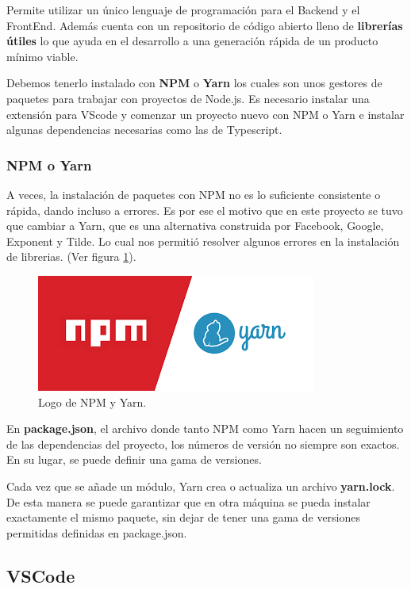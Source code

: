 \documentclass[12pt,twoside,titlepage]{report}
\begin{document}
Permite utilizar un único lenguaje de programación para el Backend y el FrontEnd. Además cuenta con un repositorio de código abierto lleno de \textbf{librerías útiles} lo que ayuda en el desarrollo a una generación rápida de un producto mínimo viable.

Debemos tenerlo instalado con \textbf{NPM} o \textbf{Yarn} los cuales son unos gestores de paquetes para trabajar con proyectos de Node.js. Es necesario instalar una extensión para VScode y comenzar un proyecto nuevo con NPM o Yarn e instalar algunas dependencias necesarias como las de Typescript.

\subsubsection{NPM o Yarn}

A veces, la instalación de paquetes con NPM no es lo suficiente consistente o rápida, dando incluso a errores. Es por ese el motivo que en este proyecto se tuvo que cambiar a Yarn, que es una alternativa construida por Facebook, Google, Exponent y Tilde. Lo cual nos permitió resolver algunos errores en la instalación de librerias.
(Ver figura \ref{fig:NPMYarnLogo}).

\begin{figure}[H]
    \centering
    \includegraphics[scale=0.4]{Nodejs/NPMvsYarn}
    \caption{Logo de NPM y Yarn.}
    \label{fig:NPMYarnLogo}
\end{figure}

En \textbf{package.json}, el archivo donde tanto NPM como Yarn hacen un seguimiento de las dependencias del proyecto, los números de versión no siempre son exactos. En su lugar, se puede definir una gama de versiones.

Cada vez que se añade un módulo, Yarn crea o actualiza un archivo \textbf{yarn.lock}.
De esta manera se puede garantizar que en otra máquina se pueda instalar exactamente el mismo paquete, sin dejar de tener una gama de versiones permitidas definidas en package.json. 


\subsection{VSCode}
\end{document}
